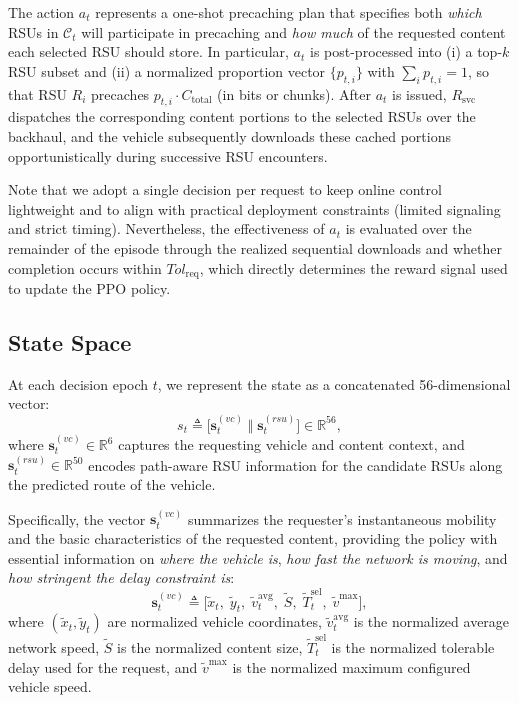 The action $a_t$ represents a one-shot precaching plan that specifies both \emph{which} RSUs in $\mathcal{C}_t$ will participate in precaching and \emph{how much} of the requested content each selected RSU should store. 
In particular, $a_t$ is post-processed into (i) a top-$k$ RSU subset and (ii) a normalized proportion vector $\{p_{t,i}\}$ with $\sum_i p_{t,i}=1$, so that RSU $R_i$ precaches $p_{t,i}\cdot C_{\text{total}}$ (in bits or chunks). 
After $a_t$ is issued, $R_{\mathrm{svc}}$ dispatches the corresponding content portions to the selected RSUs over the backhaul, and the vehicle subsequently downloads these cached portions opportunistically during successive RSU encounters.

Note that we adopt a single decision per request to keep online control lightweight and to align with practical deployment constraints (limited signaling and strict timing). 
Nevertheless, the effectiveness of $a_t$ is evaluated over the remainder of the episode through the realized sequential downloads and whether completion occurs within $Tol_{\mathrm{req}}$, which directly determines the reward signal used to update the PPO policy.

\subsection{State Space} \label{subsec:state_space}
At each decision epoch $t$, we represent the state as a concatenated 56-dimensional vector:
\begin{equation}
s_t \triangleq \big[\mathbf{s}^{(vc)}_t \;\Vert\; \mathbf{s}^{(rsu)}_t\big]\in\mathbb{R}^{56},
\end{equation}
where $\mathbf{s}^{(vc)}_t\in\mathbb{R}^{6}$ captures the requesting vehicle and content context, and $\mathbf{s}^{(rsu)}_t\in\mathbb{R}^{50}$ encodes path-aware RSU information for the candidate RSUs along the predicted route of the vehicle.

Specifically, the vector $\mathbf{s}^{(vc)}_t$ summarizes the requester’s instantaneous mobility and the basic characteristics of the requested content, providing the policy with essential information on \emph{where the vehicle is}, \emph{how fast the network is moving}, and \emph{how stringent the delay constraint is}:
\begin{equation}
\mathbf{s}^{(vc)}_t \triangleq 
\Big[
\tilde{x}_t,\;\tilde{y}_t,\;\tilde{v}^{\text{avg}}_t,\;\tilde{S},\;\tilde{T}^{\text{sel}}_t,\;\tilde{v}^{\max}
\Big],
\end{equation}
where $(\tilde{x}_t,\tilde{y}_t)$ are normalized vehicle coordinates, $\tilde{v}^{\text{avg}}_t$ is the normalized average network speed,
$\tilde{S}$ is the normalized content size, $\tilde{T}^{\text{sel}}_t$ is the normalized tolerable delay used for the request,
and $\tilde{v}^{\max}$ is the normalized maximum configured vehicle speed.

